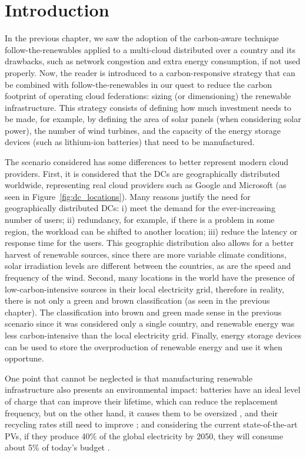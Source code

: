 \section{Introduction}

In the previous chapter, we saw the adoption of the carbon-aware technique follow-the-renewables applied to a multi-cloud distributed over a country and its drawbacks, such as network congestion and extra energy consumption, if not used properly. Now, the reader is introduced to a carbon-responsive strategy that can be combined with follow-the-renewables in our quest to reduce the carbon footprint of operating cloud federations: sizing (or dimensioning) the renewable infrastructure. This strategy consists of defining how much investment needs to be made, for example, by defining the area of solar panels (when considering solar power), the number of wind turbines, and the capacity of the energy storage devices (such as lithium-ion batteries) that need to be manufactured.


The scenario considered has some differences to better represent modern cloud providers. First, it is considered that the DCs are geographically distributed worldwide, representing real cloud providers such as Google and Microsoft (as seen in Figure~\ref{fig:dc_locations}). Many reasons justify the need for geographically distributed DCs: i) meet the demand for the ever-increasing number of users; ii) redundancy, for example, if there is a problem in some region, the workload can be shifted to another location; iii) reduce the latency or response time for the users. This geographic distribution also allows for a better harvest of renewable sources, since there are more variable climate conditions, solar irradiation levels are different between the countries, as are the speed and frequency of the  wind. Second, many locations in the world have the presence of low-carbon-intensive sources in their local electricity grid, therefore in reality, there is not only a green and brown classification (as seen in the previous chapter). The classification into brown and green made sense in the previous scenario since it was considered only a single country, and renewable energy was less carbon-intensive than the local electricity grid. Finally, energy storage devices can be used to store the overproduction of renewable energy and use it when opportune.

One point that cannot be neglected is that manufacturing renewable infrastructure also presents an environmental impact: batteries have an ideal level of charge that can improve their lifetime, which can reduce the replacement frequency, but on the other hand, it causes them to be oversized \cite{batteries_baumman}, and their recycling rates still need to improve \cite{bateries_RAHMAN}; and considering the current state-of-the-art PVs, if they produce 40\% of the global electricity by 2050, they will consume about 5\% of today’s  budget \cite{solar_co2}.

